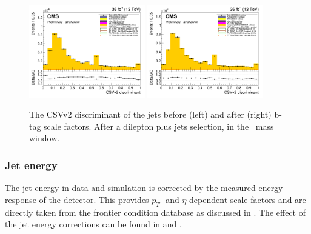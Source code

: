 \begin{figure}[htbp]
	\centering
	\includegraphics[width=0.45\textwidth]{5_Eventselection/Figures/Reweighing/bdis/2lepcontrol_afterAtLeast1Jet_afterZWindow_bdisc_all_Stack_before}
	\includegraphics[width=0.45\textwidth]{5_Eventselection/Figures/Reweighing/bdis/2lepcontrol_afterAtLeast1Jet_afterZWindow_bdisc_all_Stack_after}	
	\caption{The CSVv2 discriminant of the jets before (left) and after (right) b-tag scale factors. After a dilepton plus jets selection, in the \PZ\ mass window.}
	\label{fig:bSF}
\end{figure}

\subsubsection*{Jet energy}
\label{sec:jer}
The jet energy in data and simulation is corrected by the measured energy response of the detector. This provides $p_T$- and $\eta$ dependent scale factors and are directly taken from the frontier condition database as discussed in . 
The effect of the jet energy corrections can be found in  and . 


